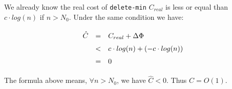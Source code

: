 We already know the real cost of \texttt{delete-min} $C_{real}$ is less or equal than $c \cdot log(n)$ if $n > N_{0}$. Under the same condition we have:

\[
\def\arraystretch{1.5}
\begin{array}{lcl}
\hat C & = & C_{real} + \Delta \Phi \\
       & < & c \cdot log(n) + (- c \cdot log(n)) \\
       & = & 0
\end{array}
\]

The formula above means, $\forall n > N_0$, we have $\hat C < 0$. Thus $\hat C = O(1)$.

